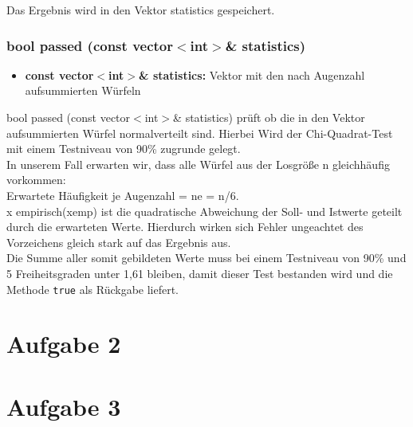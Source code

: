 \documentclass{../Vorlage/sebDenCls}
\begin{document}
Das Ergebnis wird in den Vektor statistics gespeichert.

\subsubsection{bool passed (const vector$<$int$>$\& statistics)}
\begin{itemize}
	\item \textbf{const vector$<$int$>$\& statistics:} Vektor mit den nach Augenzahl aufsummierten Würfeln
\end{itemize}
bool passed (const vector$<$int$>$\& statistics) prüft ob die in den Vektor aufsummierten Würfel normalverteilt sind. Hierbei Wird der Chi-Quadrat-Test mit einem Testniveau von 90\% zugrunde gelegt. \\

In unserem Fall erwarten wir, dass alle Würfel aus der Losgröße n gleichhäufig vorkommen:\\ 
Erwartete Häufigkeit je Augenzahl = ne = n/6.\\

x empirisch(xemp) ist die quadratische Abweichung der Soll- und Istwerte geteilt durch die erwarteten Werte. Hierdurch wirken sich Fehler ungeachtet des Vorzeichens gleich stark auf das Ergebnis aus. \\

Die Summe aller somit gebildeten Werte muss bei einem Testniveau von 90\% und 5 Freiheitsgraden unter 1,61 bleiben, damit dieser Test bestanden wird und die Methode \texttt{true} als Rückgabe liefert.

\section*{Aufgabe 2}



\section*{Aufgabe 3}
\end{document}
